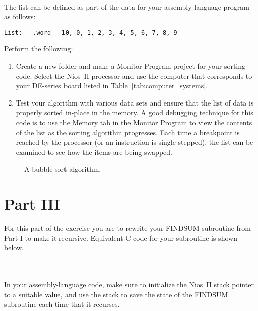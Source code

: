\documentclass[epsfig,10pt,fullpage]{article}
\begin{document}
~\\
The list can be defined as part of the data for your assembly language program as follows:

\begin{lstlisting}[style=defaultNiosStyle]
List: 	.word 	10, 0, 1, 2, 3, 4, 5, 6, 7, 8, 9
\end{lstlisting}

Perform the following:

\begin{enumerate}
\item Create a new folder and make a Monitor Program project for your sorting code. Select
the Nios~II processor and use the computer that corresponds to your DE-series board listed in Table~\ref{tab:computer_systems}.

\item
Test your algorithm with various data sets and ensure
that the list of data is properly sorted in-place in the memory. A good debugging
technique for this code is to use the Memory tab in the Monitor Program to view the
contents of the list as the sorting algorithm progresses. Each time a breakpoint is reached by
the processor (or an instruction is single-stepped), the list can be examined to see how
the items are being swapped.
\end{enumerate}

\begin{figure}[H]
\begin{center}

\end{center}
\caption{A bubble-sort algorithm.}
\label{fig:C_code}
\end{figure}

\section*{Part III}
For this part of the exercise you are to rewrite your FINDSUM subroutine from Part I to make 
it recursive.  Equivalent C code for your subroutine is shown below.

~\\

~\\

In your assembly-language code, make sure to initialize the Nios~II stack pointer to 
a suitable value, and use the stack to save the state of the FINDSUM subroutine each 
time that it recurses.
\end{document}
